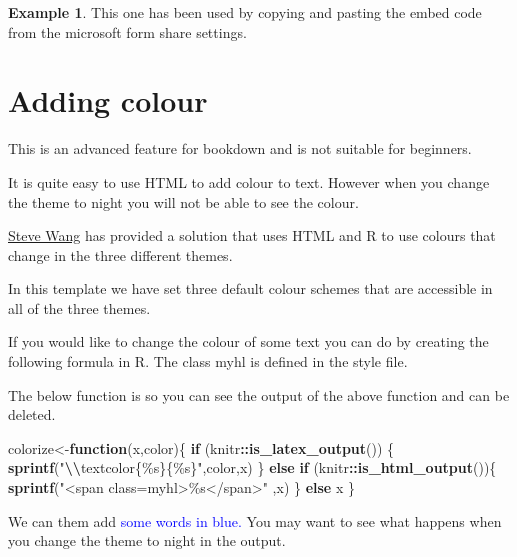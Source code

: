 \documentclass[
]{article}
\newenvironment{Shaded}{\begin{snugshade}}{\end{snugshade}}
\newcommand{\ControlFlowTok}[1]{\textcolor[rgb]{0.13,0.29,0.53}{\textbf{#1}}}
\newcommand{\FunctionTok}[1]{\textcolor[rgb]{0.13,0.29,0.53}{\textbf{#1}}}
\newcommand{\NormalTok}[1]{#1}
\newcommand{\OtherTok}[1]{\textcolor[rgb]{0.56,0.35,0.01}{#1}}
\newcommand{\SpecialCharTok}[1]{\textcolor[rgb]{0.81,0.36,0.00}{\textbf{#1}}}
\newcommand{\StringTok}[1]{\textcolor[rgb]{0.31,0.60,0.02}{#1}}
\numberwithin{equation}{section}
\numberwithin{figure}{section}
\theoremstyle{break}
\theoremstyle{definition}
\theoremstyle{definition}
\newtheorem{example}{Example}[section]
\theoremstyle{definition}
\theoremstyle{definition}
\theoremstyle{remark}
\begin{document}
\begin{example}
This one has been used by copying and pasting the embed code from the microsoft form share settings.
\end{example}

\hypertarget{adding-colour}{%
\section{Adding colour}\label{adding-colour}}

This is an advanced feature for bookdown and is not suitable for beginners.

It is quite easy to use HTML to add {colour to text.} However when you change the theme to night you will not be able to see the colour.

\href{https://www.nottingham.ac.uk/biosciences/people/qingqi.wang}{Steve Wang} has provided a solution that uses HTML and R to use colours that change in the three different themes.

In this template we have set three default colour schemes that are accessible in all of the three themes.

If you would like to change the colour of some text you can do by creating the following formula in R. The class myhl is defined in the style file.

The below function is so you can see the output of the above function and can be deleted.

\begin{Shaded}
\begin{Highlighting}[]
\NormalTok{colorize}\OtherTok{\textless{}{-}}\ControlFlowTok{function}\NormalTok{(x,color)\{}
  \ControlFlowTok{if}\NormalTok{ (knitr}\SpecialCharTok{::}\FunctionTok{is\_latex\_output}\NormalTok{()) \{}
    \FunctionTok{sprintf}\NormalTok{(}\StringTok{"}\SpecialCharTok{\textbackslash{}\textbackslash{}}\StringTok{textcolor\{\%s\}\{\%s\}"}\NormalTok{,color,x)}
\NormalTok{  \} }\ControlFlowTok{else} \ControlFlowTok{if}\NormalTok{ (knitr}\SpecialCharTok{::}\FunctionTok{is\_html\_output}\NormalTok{())\{}
    \FunctionTok{sprintf}\NormalTok{(}\StringTok{"\textless{}span class=\textquotesingle{}myhl\textquotesingle{}\textgreater{}\%s\textless{}/span\textgreater{}"}\NormalTok{ ,x)}
\NormalTok{  \} }\ControlFlowTok{else}\NormalTok{ x}
\NormalTok{\}}
\end{Highlighting}
\end{Shaded}

We can them add \textcolor{blue}{some words in blue.} You may want to see what happens when you change the theme to night in the output.
\end{document}
